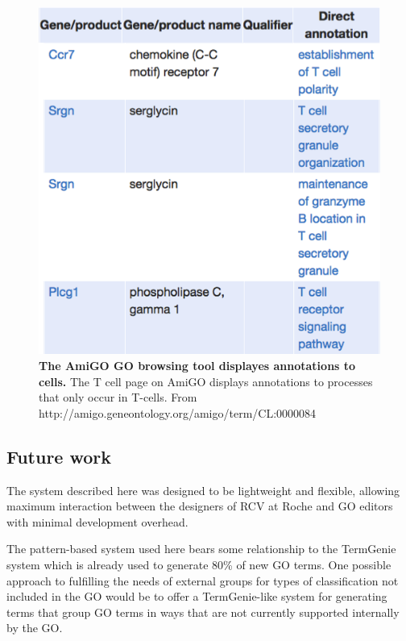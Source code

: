 \documentclass[runningheads,a4paper]{llncs}
\begin{document}
{{\begin{figure}
\centering
\includegraphics[scale=0.40]{amigo.png}
\caption{\textbf{The AmiGO \ac{GO} browsing tool displayes annotations to cells.}  The  T cell page on AmiGO displays annotations to processes that only occur in T-cells.  From http://amigo.geneontology.org/amigo/term/CL:0000084}
\label{fig:amigo}
\end{figure}

\subsection{Future work}

The system described here was designed to be lightweight and flexible, allowing maximum interaction between the designers of RCV at Roche and \ac{GO} editors with minimal development overhead.

The pattern-based system used here bears some relationship to the TermGenie system \cite{Dietze2014} which is already used to generate 80\% of new \ac{GO} terms.  One possible approach to fulfilling the needs of external groups for types of classification not included in the \ac{GO} would be to offer a TermGenie-like system for generating terms that group \ac{GO} terms in ways that are not currently supported internally by the \ac{GO}.




}}
\end{document}
